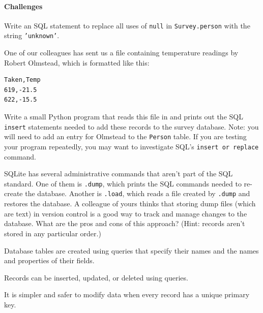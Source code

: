 \documentclass{book}
\begin{document}
\mbox{}\paragraph{Challenges}

\begin{swcenumerate}
\item
  Write an SQL statement to replace all uses of \texttt{null} in
  \texttt{Survey.person} with the string \texttt{'unknown'}.
\item
  One of our colleagues has sent us a  file
  containing temperature readings by Robert Olmstead, which is formatted
  like this:

\begin{verbatim}
Taken,Temp
619,-21.5
622,-15.5
\end{verbatim}

  Write a small Python program that reads this file in and prints out
  the SQL \texttt{insert} statements needed to add these records to the
  survey database. Note: you will need to add an entry for Olmstead to
  the \texttt{Person} table. If you are testing your program repeatedly,
  you may want to investigate SQL's \texttt{insert or replace} command.
\item
  SQLite has several administrative commands that aren't part of the SQL
  standard. One of them is \texttt{.dump}, which prints the SQL commands
  needed to re-create the database. Another is \texttt{.load}, which
  reads a file created by \texttt{.dump} and restores the database. A
  colleague of yours thinks that storing dump files (which are text) in
  version control is a good way to track and manage changes to the
  database. What are the pros and cons of this approach? (Hint: records
  aren't stored in any particular order.)
\end{swcenumerate}

\begin{keypoints}
\begin{swcitemize}
\item
  Database tables are created using queries that specify their names and
  the names and properties of their fields.
\item
  Records can be inserted, updated, or deleted using queries.
\item
  It is simpler and safer to modify data when every record has a unique
  primary key.
\end{swcitemize}
\end{keypoints}
\end{document}

